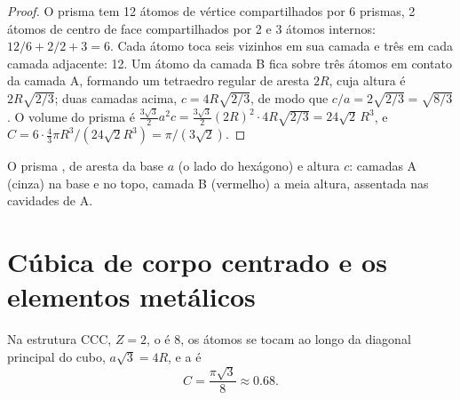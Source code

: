 \begin{proof}
O prisma tem 12 átomos de vértice compartilhados por 6 prismas, 2 átomos
de centro de face compartilhados por 2 e 3 átomos internos:
$12/6 + 2/2 + 3 = 6$. Cada átomo toca seis vizinhos em sua camada e três
em cada camada adjacente: 12. Um átomo da camada B fica sobre três
átomos em contato da camada A, formando um tetraedro regular de aresta
$2R$, cuja altura é $2R\sqrt{2/3}$; duas camadas acima,
$c = 4R\sqrt{2/3}$, de modo que $c/a = 2\sqrt{2/3} = \sqrt{8/3}$. O volume
do prisma é $\frac{3\sqrt3}{2}a^2 c = \frac{3\sqrt3}{2}(2R)^2 \cdot
4R\sqrt{2/3} = 24\sqrt2\,R^3$, e $C = 6 \cdot \frac43\pi R^3/(24\sqrt2
R^3) = \pi/(3\sqrt2)$.
\end{proof}

\begin{omfigure}

{\small O prisma , de aresta da base $a$ (o lado do
hexágono) e altura $c$: camadas A (cinza) na base e no topo, camada B
(vermelho) a meia altura, assentada nas cavidades de A.}
\end{omfigure}

\section{Cúbica de corpo centrado e os elementos metálicos}

\begin{proposition}\label{prop:b1:crystals-metals:bcc}
Na estrutura CCC, $Z = 2$, o  é 8, os átomos se
tocam ao longo da diagonal principal do cubo, $a\sqrt3 = 4R$, e a
 é
\[
  C = \frac{\pi\sqrt3}{8} \approx 0.68 .
\]
\end{proposition}

